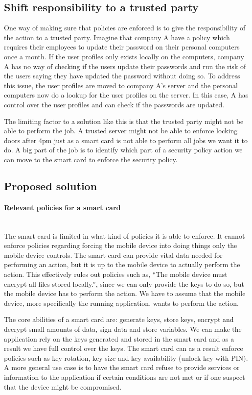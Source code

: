 \subsection{Shift responsibility to a trusted party}
One way of making sure that policies are enforced is to give the responsibility of the action to a trusted party. Imagine that company A have a policy which requires their employees to update their password on their personal computers once a month. If the user profiles only exists locally on the computers, company A has no way of checking if the users update their passwords and run the risk of the users saying they have updated the password without doing so. To address this issue, the user profiles are moved to company A's server and the personal computers now do a lookup for the user profiles on the server. In this case, A has control over the user profiles and can check if the passwords are updated.

The limiting factor to a solution like this is that the trusted party might not be able to perform the job. A trusted server might not be able to enforce locking doors after 4pm just as a smart card is not able to perform all jobs we want it to do. A big part of the job is to identify which part of a security policy action we can move to the smart card to enforce the security policy.

\subsection{Proposed solution}
\label{sec:policySolution}

\paragraph{Relevant policies for a smart card}\mbox{}\\
The smart card is limited in what kind of policies it is able to enforce. It cannot enforce policies regarding forcing the mobile device into doing things only the mobile device controls. The smart card can provide vital data needed for performing an action, but it is up to the mobile device to actually perform the action. This effectively rules out policies such as, ``The mobile device must encrypt all files stored locally.'', since we can only provide the keys to do so, but the mobile device has to perform the action. We have to assume that the mobile device, more specifically the running application, wants to perform the action.

The core abilities of a smart card are: generate keys, store keys, encrypt and decrypt small amounts of data, sign data and store variables. We can make the application rely on the keys generated and stored in the smart card and as a result we have full control over the keys. The smart card can as a result enforce policies such as key rotation, key size and key availability (unlock key with PIN). A more general use case is to have the smart card refuse to provide services or information to the application if certain conditions are not met or if one suspect that the device might be compromised.

